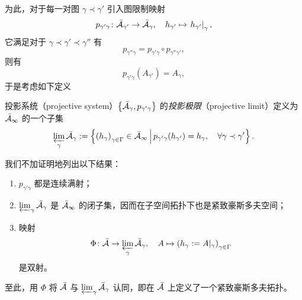			为此，对于每一对图 $\gamma \prec \gamma'$ 引入图限制映射
			\begin{equation}
				p_{\gamma' \gamma} \colon \bar{\configurationspace{A}}_{\gamma'} \rightarrow \bar{\configurationspace{A}}_\gamma \qc h_{\gamma'} \mapsto \left.h_{\gamma'}\right|_{\gamma},
			\end{equation}
			它满足对于 $\gamma \prec \gamma' \prec \gamma''$ 有
			\begin{equation}
				p_{\gamma'' \gamma} = p_{\gamma' \gamma} \circ p_{\gamma'' \gamma'},
			\end{equation}
			则有
			\begin{equation}
				p_{\gamma' \gamma}\left( A_{\gamma'} \right) = A_\gamma,
			\end{equation}
			于是考虑如下定义
			\begin{Definition}
				投影系统（projective system）$\left\{ \bar{\mathcal{A}}_\gamma, p_{\gamma' \gamma} \right\}$ 的\emph{投影极限}（projective limit）定义为 $\bar{\mathcal{A}}_\infty$ 的一个子集
				\begin{equation}
					\varprojlim_{\gamma} \bar{\configurationspace{A}}_\gamma \definedby \left\{ {\left( h_\gamma \right)}_{\gamma \in \Gamma} \in \bar{\configurationspace{A}}_{\infty} \,\middle\vert\, p_{\gamma' \gamma}(h_{\gamma'}) = h_\gamma\qc \forall \gamma \prec \gamma' \right\}.
				\end{equation}
			\end{Definition}
			我们不加证明地列出以下结果：
			\begin{Property}
				\begin{enumerate}
					\item $p_{\gamma' \gamma}$ 都是连续满射；
					\item $\varprojlim_{\gamma} \bar{\mathcal{A}}_\gamma$ 是 $\bar{\mathcal{A}}_\infty$ 的闭子集，因而在子空间拓扑下也是紧致豪斯多夫空间；
					\item 映射
					\begin{equation}
						\Phi \colon \bar{\configurationspace{A}} \rightarrow \varprojlim_{\gamma} \bar{\configurationspace{A}}_\gamma \qc A \mapsto {\left( h_\gamma \definedby A|_\gamma \right)}_{\gamma \in \Gamma}
					\end{equation}
					是双射。
				\end{enumerate}
			\end{Property}
			至此，用 $\Phi$ 将 $\bar{\mathcal{A}}$ 与 $\varprojlim_{\gamma} \bar{\mathcal{A}}_\gamma$ 认同，即在 $\bar{\mathcal{A}}$ 上定义了一个紧致豪斯多夫拓扑。

